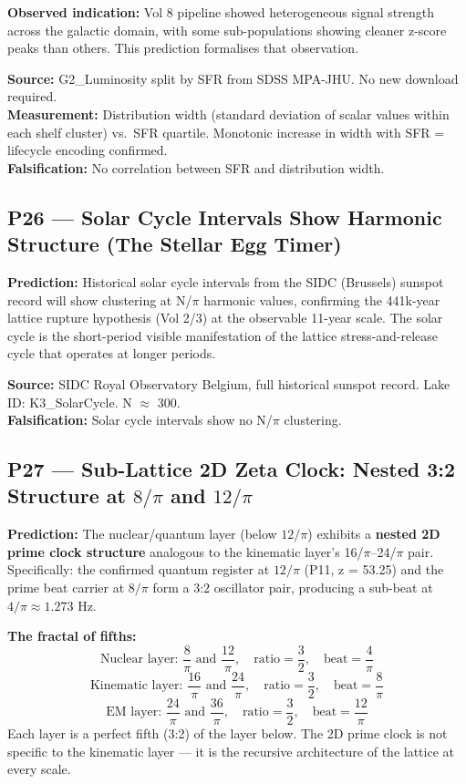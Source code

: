 \documentclass[12pt, letterpaper]{article}
\begin{document}
\medskip
\textbf{Observed indication:} Vol 8 pipeline showed heterogeneous signal
strength across the galactic domain, with some sub-populations showing
cleaner z-score peaks than others. This prediction formalises that
observation.

\medskip
\textbf{Source:} G2\_Luminosity split by SFR from SDSS MPA-JHU.
No new download required.\\
\textbf{Measurement:} Distribution width (standard deviation of scalar values
within each shelf cluster) vs.\ SFR quartile. Monotonic increase in width
with SFR = lifecycle encoding confirmed.\\
\textbf{Falsification:} No correlation between SFR and distribution width.

\subsection*{P26 --- Solar Cycle Intervals Show Harmonic Structure
(The Stellar Egg Timer)}

\textbf{Prediction:} Historical solar cycle intervals from the SIDC
(Brussels) sunspot record will show clustering at N/$\pi$ harmonic values,
confirming the 441k-year lattice rupture hypothesis (Vol 2/3) at the
observable 11-year scale. The solar cycle is the short-period visible
manifestation of the lattice stress-and-release cycle that operates at
longer periods.

\medskip
\textbf{Source:} SIDC Royal Observatory Belgium, full historical sunspot
record. Lake ID: K3\_SolarCycle. N $\approx$ 300.\\
\textbf{Falsification:} Solar cycle intervals show no N/$\pi$ clustering.

\subsection*{P27 --- Sub-Lattice 2D Zeta Clock: Nested 3:2 Structure at
$8/\pi$ and $12/\pi$}

\textbf{Prediction:} The nuclear/quantum layer (below $12/\pi$) exhibits a
\textbf{nested 2D prime clock structure} analogous to the kinematic layer's
16/$\pi$--24/$\pi$ pair. Specifically: the confirmed quantum register at
$12/\pi$ (P11, z = 53.25) and the prime beat carrier at $8/\pi$ form a
3:2 oscillator pair, producing a sub-beat at $4/\pi \approx 1.273$ Hz.

\medskip
\textbf{The fractal of fifths:}
\[
\text{Nuclear layer: } \frac{8}{\pi} \text{ and } \frac{12}{\pi},
\quad \text{ratio} = \frac{3}{2}, \quad \text{beat} = \frac{4}{\pi}
\]
\[
\text{Kinematic layer: } \frac{16}{\pi} \text{ and } \frac{24}{\pi},
\quad \text{ratio} = \frac{3}{2}, \quad \text{beat} = \frac{8}{\pi}
\]
\[
\text{EM layer: } \frac{24}{\pi} \text{ and } \frac{36}{\pi},
\quad \text{ratio} = \frac{3}{2}, \quad \text{beat} = \frac{12}{\pi}
\]
Each layer is a perfect fifth (3:2) of the layer below. The 2D prime clock
is not specific to the kinematic layer --- it is the recursive architecture
of the lattice at every scale.
\end{document}
